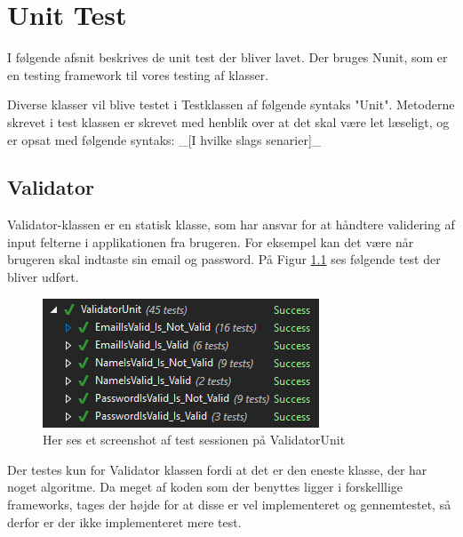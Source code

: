 \chapter{Unit Test}
I følgende afsnit beskrives de unit test der bliver lavet. Der bruges Nunit\cite{NUnit}, som er en testing framework til vores testing af klasser. 

Diverse klasser vil blive testet i Testklassen af følgende syntaks "Unit". Metoderne skrevet i test klassen er skrevet med henblik over at det skal være let læseligt, og er opsat med følgende syntaks: 
\_[I hvilke slags senarier]\_ 

\section{Validator}
Validator-klassen er en statisk klasse, som har ansvar for at håndtere validering af input felterne i applikationen fra brugeren. For eksempel kan det være når brugeren skal indtaste sin email og password. På Figur \ref{fig:ValidatorUnit} ses følgende test der bliver udført.
\begin{figure}[H]
	\centering
	\includegraphics[width=0.6\linewidth]{Unit/ValidatorUnit.PNG}
	\caption{Her ses et screenshot af test sessionen på ValidatorUnit}
	\label{fig:ValidatorUnit}
\end{figure}
 Der testes kun for Validator klassen fordi at det er den eneste klasse, der har noget algoritme. Da meget af koden som der benyttes ligger i forskelllige frameworks, tages der højde for at disse er vel implementeret og gennemtestet, så derfor er der ikke implementeret mere test. 
\clearpage


